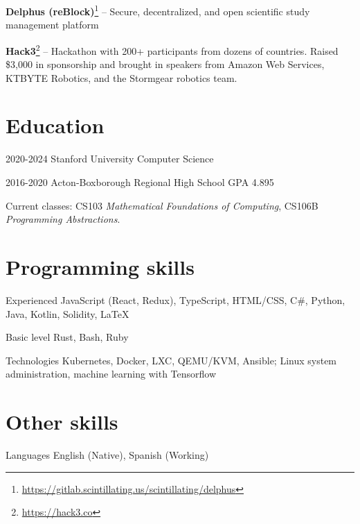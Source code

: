 \documentclass[paper=letter]{tccv}
\begin{document}
\textbf{Delphus
(reBlock)}\footnote{\url{https://gitlab.scintillating.us/scintillating/delphus}}
-- Secure, decentralized, and open scientific study management platform

\textbf{Hack3}\footnote{\url{https://hack3.co}} -- Hackathon with 200+
participants from dozens of countries. Raised \$3,000 in sponsorship and brought
in speakers from Amazon Web Services, KTBYTE Robotics, and the Stormgear
robotics team. 

\textbf{}

\section{Education}

\begin{yearlist}
     \item{2020-2024}
          {Stanford University} {Computer Science}
     \item{2016-2020}
          {Acton-Boxborough Regional High School} {GPA 4.895}
\end{yearlist}

Current classes: CS103 \textit{Mathematical Foundations of Computing}, CS106B
\textit{Programming Abstractions}.

\section{Programming skills}

\begin{factlist}

\item{Experienced}
     {JavaScript (React, Redux), TypeScript, HTML/CSS, C\#, Python, Java,
     Kotlin, Solidity, \LaTeX}

\item{Basic level}
     {Rust, Bash, Ruby}

\item{Technologies}
     {Kubernetes, Docker, LXC, QEMU/KVM, Ansible; Linux system administration,
     machine learning with Tensorflow}

\end{factlist}

\section{Other skills}

\begin{factlist}

     \item{Languages}
          {English (Native), Spanish (Working)}
     
\end{factlist}
\end{document}
